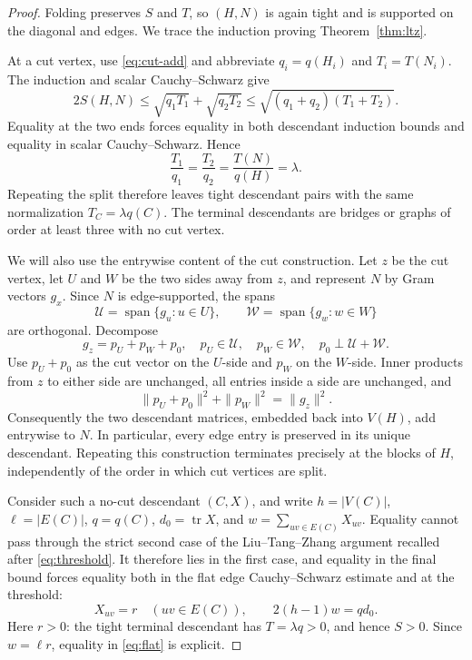 \documentclass[11pt]{article}
\theoremstyle{remark}
\newcommand{\tr}{\operatorname{tr}}
\begin{document}
\begin{proof}
Folding preserves $S$ and $T$, so $(H,N)$ is again tight and is supported on
the diagonal and edges.  We trace the induction proving
Theorem~\ref{thm:ltz}.

At a cut vertex, use \eqref{eq:cut-add} and abbreviate
$q_i=q(H_i)$ and $T_i=T(N_i)$.  The induction and scalar
Cauchy--Schwarz give
\[
 2S(H,N)
 \leq \sqrt{q_1T_1}+\sqrt{q_2T_2}
 \leq \sqrt{(q_1+q_2)(T_1+T_2)}.
\]
Equality at the two ends forces equality in both descendant induction
bounds and equality in scalar Cauchy--Schwarz.  Hence
\begin{equation}\label{eq:ratio}
 \frac{T_1}{q_1}=\frac{T_2}{q_2}
 =\frac{T(N)}{q(H)}=\lambda.
\end{equation}
Repeating the split therefore leaves tight descendant pairs with the same
normalization $T_C=\lambda q(C)$.  The terminal descendants are bridges or
graphs of order at least three with no cut vertex.

We will also use the entrywise content of the cut construction.  Let $z$ be
the cut vertex, let $U$ and $W$ be the two sides away from $z$, and represent
$N$ by Gram vectors $g_x$.  Since $N$ is edge-supported, the spans
\[
 \mathcal U=\operatorname{span}\{g_u:u\in U\},\qquad
 \mathcal W=\operatorname{span}\{g_w:w\in W\}
\]
are orthogonal.  Decompose
\[
 g_z=p_U+p_W+p_0,
 \quad p_U\in\mathcal U,
 \quad p_W\in\mathcal W,
 \quad p_0\perp\mathcal U+\mathcal W.
\]
Use $p_U+p_0$ as the cut vector on the $U$-side and $p_W$ on the
$W$-side.  Inner products from $z$ to either side are unchanged, all entries
inside a side are unchanged, and
\[
 \|p_U+p_0\|^2+\|p_W\|^2=\|g_z\|^2.
\]
Consequently the two descendant matrices, embedded back into $V(H)$, add
entrywise to $N$.  In particular, every edge entry is preserved in its unique
descendant.  Repeating this construction terminates precisely at the blocks
of $H$, independently of the order in which cut vertices are split.

Consider such a no-cut descendant $(C,X)$, and write $h=|V(C)|$,
$\ell=|E(C)|$, $q=q(C)$, $d_0=\tr X$, and
$w=\sum_{uv\in E(C)}X_{uv}$.  Equality cannot pass through the strict second
case of the Liu--Tang--Zhang argument recalled after
\eqref{eq:threshold}.  It therefore lies in the first case, and equality in
the final bound forces equality both in the flat edge Cauchy--Schwarz
estimate and at the threshold:
\begin{equation}\label{eq:no-cut-equalities}
 X_{uv}=r\quad(uv\in E(C)),
 \qquad 2(h-1)w=qd_0.
\end{equation}
Here $r>0$: the tight terminal descendant has $T=\lambda q>0$, and hence
$S>0$.  Since
$w=\ell r$, equality in \eqref{eq:flat} is explicit.


\end{proof}
\end{document}

